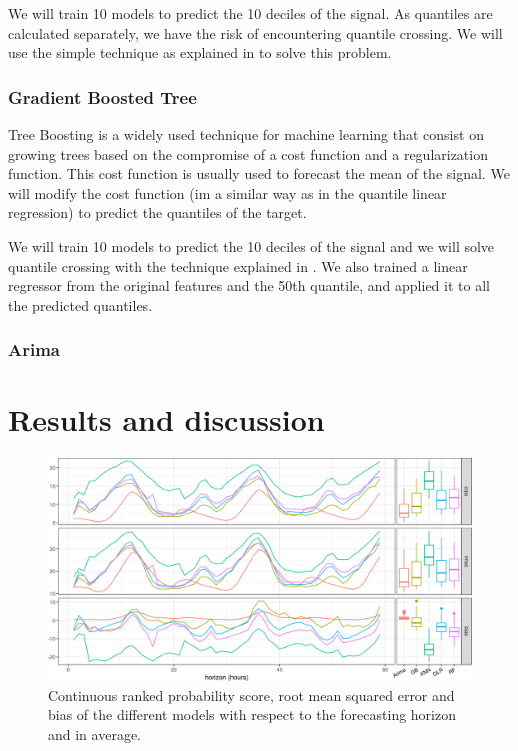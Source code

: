 \documentclass[a4paper,twocolumn,5p]{elsarticle}
\begin{document}
We will train 10 models to predict the 10 deciles of the signal. As quantiles are 
calculated separately, we have the risk of encountering quantile crossing.
We will use the simple technique as explained in \cite{cross} to solve this problem.

\subsubsection{Gradient Boosted Tree}

Tree Boosting \cite{gradientboost} is a widely used technique for machine learning 
that consist on growing trees based on the compromise 
of a cost function and a regularization function. This cost function is usually 
used to forecast 
the mean of the signal. We will modify the cost function (im a similar way as in 
the quantile linear regression) to predict the quantiles of the target. 

We will train 10 models to predict the 10 deciles of the signal and we will solve 
 quantile crossing with the technique explained in \cite{cross}. We also trained a 
 linear regressor from the original features and the 50th quantile, 
and applied it to all the predicted quantiles. 

\subsubsection{Arima}

\section{Results and discussion}
\label{sec:results}

\begin{figure}
  \centering
  \includegraphics[width=\textwidth]{results/errorGraph}
  \caption{Continuous ranked probability score, root mean squared
    error and bias of the different models with respect to the
    forecasting horizon and in average.}
  \label{figure:errorGraph}
\end{figure}
\end{document}
